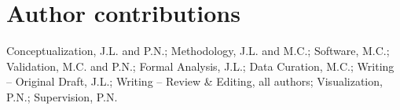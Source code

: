 \section{Author contributions}
Conceptualization, J.L. and P.N.; Methodology, J.L. and M.C.; Software, M.C.;
Validation, M.C. and P.N.; Formal Analysis, J.L.; Data Curation, M.C.; Writing --
Original Draft, J.L.; Writing -- Review \& Editing, all authors; Visualization,
P.N.; Supervision, P.N.
